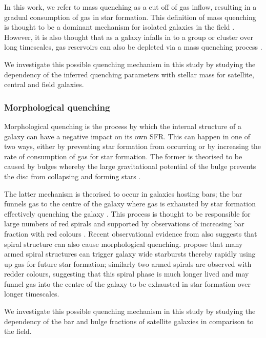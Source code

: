 \documentclass[useAMS,usenatbib]{mn2e}
\begin{document}
In this work, we refer to mass quenching as a cut off of gas inflow, resulting in a gradual consumption of gas in star formation. This definition of mass quenching is thought to be a dominant mechanism for isolated galaxies in the field \citep{kormendy04}. However, it is also thought that as a galaxy infalls in to a group or cluster over long timescales, gas reservoirs can also be depleted via a mass quenching process \citep{peng12}. 

We investigate this possible quenching mechanism in this study by studying the dependency of the inferred quenching parameters with stellar mass for satellite, central and field galaxies. 
 
\subsubsection{Morphological quenching}\label{sec:morphquench}

Morphological quenching is the process by which the internal structure of a galaxy can have a negative impact on its own SFR. This can happen in one of two ways, either by preventing star formation from occurring or by increasing the rate of consumption of gas for star formation. The former is theorised to be caused by bulges \citep{bluck14} whereby the large gravitational potential of the bulge prevents the disc from collapsing and forming stars \citep{Fang13}. 

The latter mechanism is theorised to occur in galaxies hosting bars; the bar funnels gas to the centre of the galaxy \citep{athanassoula92a} where gas is exhausted by star formation effectively quenching the galaxy \citep{zurita04, sheth05}. This process is thought to be responsible for large numbers of red spirals and supported by observations of increasing bar fraction with red colours \citep{masters11a}. Recent observational evidence from \cite{hart16} also suggests that spiral structure can also cause morphological quenching. \citeauthor{hart16} propose that many armed spiral structures can trigger galaxy wide starbursts thereby rapidly using up gas for future star formation; similarly two armed spirals are observed with redder colours, suggesting that this spiral phase is much longer lived and may funnel gas into the centre of the galaxy to be exhausted in star formation over longer timescales.  


We investigate this possible quenching mechanism in this study by studying the dependency of the bar and bulge fractions of satellite galaxies in comparison to the field.  
\end{document}
